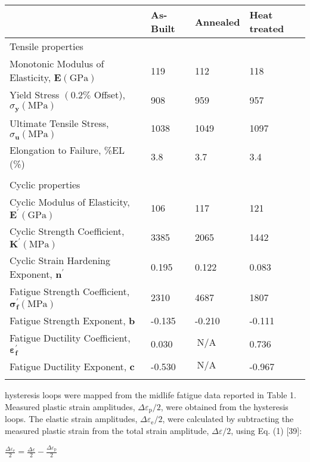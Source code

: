 \documentclass[10pt]{article}
\begin{document}
\begin{center}
\begin{tabular}{llll}
\hline
 & As-Built & Annealed & Heat treated \\
\hline
Tensile properties &  &  &  \\
Monotonic Modulus of Elasticity, $\boldsymbol{E}(\mathrm{GPa})$ & 119 & 112 & 118 \\
Yield Stress $\left(0.2 \%\right.$ Offset), $\sigma_{\mathbf{y}}(\mathrm{MPa})$ & 908 & 959 & 957 \\
Ultimate Tensile Stress, $\sigma_{\mathbf{u}}(\mathrm{MPa})$ & 1038 & 1049 & 1097 \\
Elongation to Failure, \%EL (\%) & 3.8 & 3.7 & 3.4 \\
 &  &  &  \\
Cyclic properties &  &  &  \\
Cyclic Modulus of Elasticity, $\boldsymbol{E}^{\prime}(\mathrm{GPa})$ & 106 & 117 & 121 \\
Cyclic Strength Coefficient, $\boldsymbol{K}^{\prime}(\mathrm{MPa})$ & 3385 & 2065 & 1442 \\
Cyclic Strain Hardening Exponent, $\boldsymbol{n}^{\prime}$ & 0.195 & 0.122 & 0.083 \\
Fatigue Strength Coefficient, $\boldsymbol{\sigma}_{\mathbf{f}}^{\prime}(\mathrm{MPa})$ & 2310 & 4687 & 1807 \\
Fatigue Strength Exponent, $\boldsymbol{b}$ & -0.135 & -0.210 & -0.111 \\
Fatigue Ductility Coefficient, $\boldsymbol{\varepsilon}_{\mathbf{f}}^{\prime}$ & 0.030 & $\mathrm{~N} / \mathrm{A}$ & 0.736 \\
Fatigue Ductility Exponent, $\boldsymbol{c}$ & -0.530 & $\mathrm{~N} / \mathrm{A}$ & -0.967 \\
\hline
 &  &  &  \\
\hline
\end{tabular}
\end{center}

hysteresis loops were mapped from the midlife fatigue data reported in Table 1. Measured plastic strain amplitudes, $\Delta \varepsilon_{\mathrm{p}} / 2$, were obtained from the hysteresis loops. The elastic strain amplitudes, $\Delta \varepsilon_{\mathrm{e}} / 2$, were calculated by subtracting the measured plastic strain from the total strain amplitude, $\Delta \varepsilon / 2$, using Eq. (1) [39]:

$\frac{\Delta \varepsilon_{\mathrm{e}}}{2}=\frac{\Delta \varepsilon}{2}-\frac{\Delta \varepsilon_{\mathrm{p}}}{2}$
\end{document}
